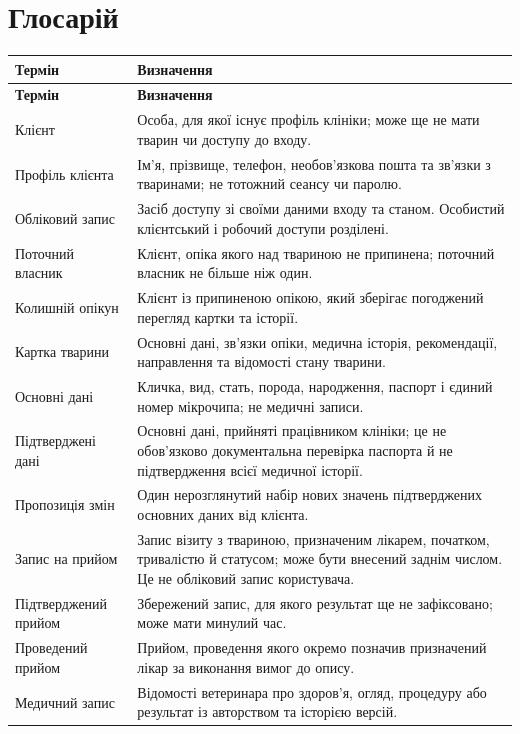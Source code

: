 \documentclass[11pt,a4paper]{article}
\begin{document}
\section{Глосарій}
\begin{longtable}{>{\raggedright\arraybackslash}p{4.3cm} >{\raggedright\arraybackslash}p{11.3cm}}
\toprule
\textbf{Термін} & \textbf{Визначення} \\ \midrule
\endfirsthead
\toprule
\textbf{Термін} & \textbf{Визначення} \\ \midrule
\endhead
\bottomrule
\endfoot
Клієнт & Особа, для якої існує профіль клініки; може ще не мати тварин чи доступу до входу. \\
Профіль клієнта & Ім’я, прізвище, телефон, необов’язкова пошта та зв’язки з тваринами; не тотожний сеансу чи паролю. \\
Обліковий запис & Засіб доступу зі своїми даними входу та станом. Особистий клієнтський і робочий доступи розділені. \\
Поточний власник & Клієнт, опіка якого над твариною не припинена; поточний власник не більше ніж один. \\
Колишній опікун & Клієнт із припиненою опікою, який зберігає погоджений перегляд картки та історії. \\
Картка тварини & Основні дані, зв’язки опіки, медична історія, рекомендації, направлення та відомості стану тварини. \\
Основні дані & Кличка, вид, стать, порода, народження, паспорт і єдиний номер мікрочипа; не медичні записи. \\
Підтверджені дані & Основні дані, прийняті працівником клініки; це не обов’язково документальна перевірка паспорта й не підтвердження всієї медичної історії. \\
Пропозиція змін & Один нерозглянутий набір нових значень підтверджених основних даних від клієнта. \\
Запис на прийом & Запис візиту з твариною, призначеним лікарем, початком, тривалістю й статусом; може бути внесений заднім числом. Це не обліковий запис користувача. \\
Підтверджений прийом & Збережений запис, для якого результат ще не зафіксовано; може мати минулий час. \\
Проведений прийом & Прийом, проведення якого окремо позначив призначений лікар за виконання вимог до опису. \\
Медичний запис & Відомості ветеринара про здоров’я, огляд, процедуру або результат із авторством та історією версій. \\

\end{longtable}
\end{document}
